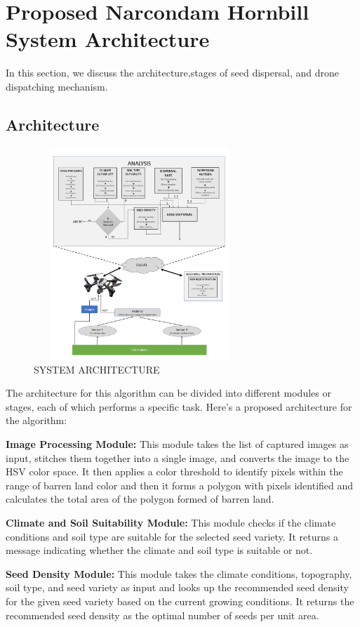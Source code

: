 \documentclass[pmlr,twocolumn,10pt]{jmlr}
\begin{document}
\section{Proposed Narcondam Hornbill System Architecture}

In this section, we discuss the architecture,stages of seed dispersal, and drone dispatching mechanism.
\subsection{Architecture}

\begin{figure}[htp]
    \centering
    \includegraphics[width=8cm,height=8cm]{architecture_ml.png}
    \caption{SYSTEM ARCHITECTURE}
    \label{fig:galaxy}
\end{figure}

The architecture for this algorithm can be divided into different modules or stages, each of which performs a specific task. Here's a proposed architecture for the algorithm:

\textbf{Image Processing Module:} This module takes the list of captured images as input, stitches them together into a single image, and converts the image to the HSV color space. It then applies a color threshold to identify pixels within the range of barren land color and then it forms a polygon with pixels identified and calculates the total area of the polygon formed of barren land.

\textbf{Climate and Soil Suitability Module:} This module checks if the climate conditions and soil type are suitable for the selected seed variety. It returns a message indicating whether the climate and soil type is suitable or not.

\textbf{Seed Density Module:} This module takes the climate conditions, topography, soil type, and seed variety as input and looks up the recommended seed density for the given seed variety based on the current growing conditions. It returns the recommended seed density as the optimal number of seeds per unit area.
\end{document}
